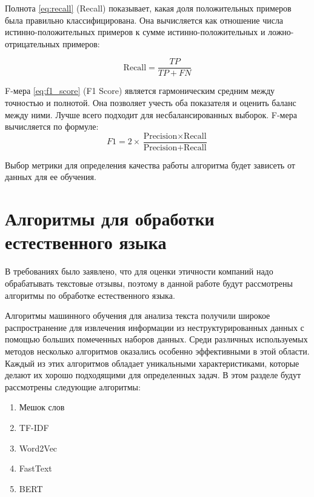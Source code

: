 \documentclass[PI, VKR]{HSEUniversity}
\begin{document}
Полнота \ref{eq:recall} (Recall) показывает, какая доля положительных примеров была правильно классифицирована. Она вычисляется как отношение числа истинно-положительных примеров к сумме истинно-положительных и ложно-отрицательных примеров:

\begin{equation}
\label{eq:recall}
  \text{{Recall}} = \frac{{TP}}{{TP + FN}}
\end{equation}

F-мера \ref{eq:f1_score} (F1 Score) является гармоническим средним между точностью и полнотой. Она позволяет учесть оба показателя и оценить баланс между ними. Лучше всего подходит для несбалансированных выборок. F-мера вычисляется по формуле:
\begin{equation}
\label{eq:f1_score}
F1 = 2 \times \frac{{\text{{Precision}} \times \text{{Recall}}}}{{\text{{Precision}} + \text{{Recall}}}}
\end{equation}

Выбор метрики для определения качества работы алгоритма будет зависеть от данных для ее обучения.
\section{Алгоритмы для обработки естественного языка}
\label{sec:org7113e2e}
В требованиях было заявлено, что для оценки этичности компаний надо обрабатывать текстовые отзывы, поэтому в данной работе будут рассмотрены алгоритмы по обработке естественного языка.

Алгоритмы машинного обучения для анализа текста получили широкое распространение для извлечения информации из неструктурированных данных с помощью больших помеченных наборов данных. Среди различных используемых методов несколько алгоритмов оказались особенно эффективными в этой области. Каждый из этих алгоритмов обладает уникальными характеристиками, которые делают их хорошо подходящими для определенных задач. В этом разделе будут рассмотрены следующие алгоритмы:
\begin{enumerate}
\item Мешок слов
\item TF-IDF
\item Word2Vec
\item FastText
\item BERT
\end{enumerate}
\end{document}
